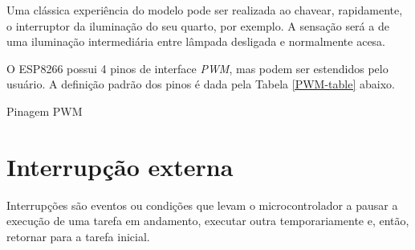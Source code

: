 \documentclass[
	11pt,				%
	openright,			%
	twoside,			%
	a5paper,			%
	english,			%
	french,				%
	spanish,			%
	brazil,				%
	sumario=tradicional
]{abntex2}
\begin{document}
\vspace{7pt}
           \begin{tcolorbox}[colbacktitle=blue!70!white!50,
title={\vspace{-13pt}\texttt{[image: interrogacao.png]} \hspace{2pt} \textsf{\textbf{Você sabia?}\vspace{4pt}}},coltitle=black, colback=white,arc=4mm, outer arc=3.5mm]
\raggedright

Uma clássica experiência do modelo pode ser realizada ao chavear, rapidamente, o interruptor da iluminação do seu quarto, por exemplo. A sensação será a de uma iluminação intermediária entre lâmpada desligada e normalmente acesa.

\end{tcolorbox}



O ESP8266 possui 4 pinos de interface \textit{PWM}, mas podem ser estendidos pelo usuário. A definição padrão dos pinos é dada pela Tabela \ref{PWM-table} abaixo.



\begin{table}[ht]
    \centering
    \caption{Pinagem PWM \label{PWM-table}}
\end{table}     
     

               
\section{Interrupção externa}
        Interrupções são eventos ou condições que levam o microcontrolador a pausar a execução de uma tarefa em andamento, executar outra temporariamente e, então, retornar para a tarefa inicial.
    
\end{document}
